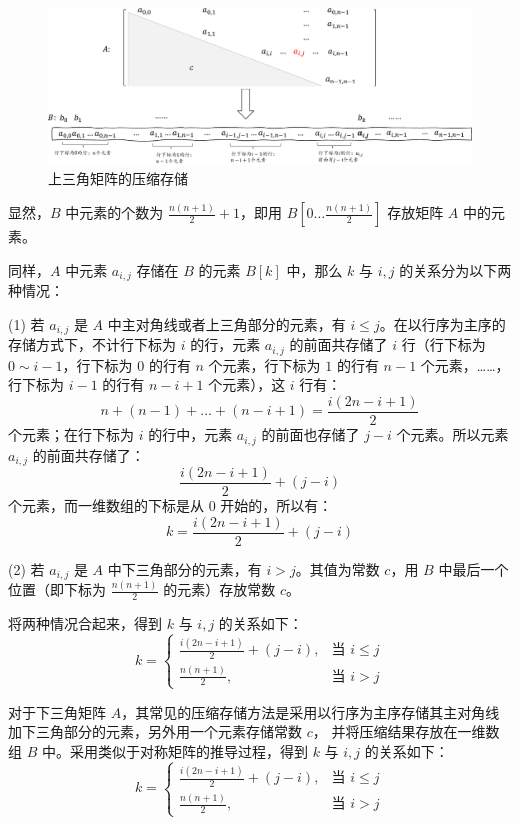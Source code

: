 \documentclass[lang=cn,newtx,10pt,scheme=chinese]{elegantbook}
\begin{document}
\begin{figure}[h]
  \centering
  \includegraphics[width=1\textwidth]{./figure/pdf/cropped/upperMatrix.pdf}
  \caption{上三角矩阵的压缩存储}
  \label{fig:upperMatrix}
\end{figure}
显然，$B$ 中元素的个数为 $\frac{n(n+1)}{2} + 1$，即用 $B[0 \dots \frac{n(n+1)}{2}]$ 存放矩阵 $A$ 中的元素。

同样，$A$ 中元素 $a_{i,j}$ 存储在 $B$ 的元素 $B[k]$ 中，那么 $k$ 与 $i,j$ 的关系分为以下两种情况：

(1) 若 $a_{i,j}$ 是 $A$ 中主对角线或者上三角部分的元素，有 $i \leq j$。在以行序为主序的存储方式下，不计行下标为 $i$ 的行，元素 $a_{i,j}$ 的前面共存储了 $i$ 行（行下标为 $0 \sim i-1$，行下标为 $0$ 的行有 $n$ 个元素，行下标为 $1$ 的行有 $n-1$ 个元素，……，行下标为 $i-1$ 的行有 $n-i+1$ 个元素），这 $i$ 行有：
\[
n + (n-1) + \dots + (n-i+1) = \frac{i(2n-i+1)}{2}
\]
个元素；在行下标为 $i$ 的行中，元素 $a_{i,j}$ 的前面也存储了 $j-i$ 个元素。所以元素 $a_{i,j}$ 的前面共存储了：
\[
\frac{i(2n-i+1)}{2} + (j-i)
\]
个元素，而一维数组的下标是从 $0$ 开始的，所以有：
\[
k = \frac{i(2n-i+1)}{2} + (j-i)
\]

(2) 若 $a_{i,j}$ 是 $A$ 中下三角部分的元素，有 $i > j$。其值为常数 $c$，用 $B$ 中最后一个位置（即下标为 $\frac{n(n+1)}{2}$ 的元素）存放常数 $c$。

将两种情况合起来，得到 $k$ 与 $i,j$ 的关系如下：
\[
k =
\begin{cases} 
\frac{i(2n-i+1)}{2} + (j-i), & \text{当 } i \leq j \\ 
\frac{n(n+1)}{2}, & \text{当 } i > j
\end{cases}
\]

对于下三角矩阵 $A$，其常见的压缩存储方法是采用以行序为主序存储其主对角线加下三角部分的元素，另外用一个元素存储常数 $c$，
并将压缩结果存放在一维数组 $B$ 中。采用类似于对称矩阵的推导过程，得到 $k$ 与 $i,j$ 的关系如下：
\[
k =
\begin{cases} 
\frac{i(2n-i+1)}{2} + (j-i), & \text{当 } i \leq j \\ 
\frac{n(n+1)}{2}, & \text{当 } i > j
\end{cases}
\]
\end{document}
